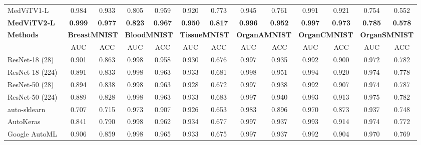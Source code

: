 \documentclass[times,twocolumn,final]{elsarticle}
\begin{document}
\begin{table*}[!htb]
\begin{center}
{\begin{tabular}{l||cc||cc||cc||cc||cc||cc}
            MedViTV1-L~\cite{manzari2023medvit}  & 0.984 & 0.933 &   {0.805} &   {0.959} & {0.920} &  {0.773} &  0.945 & 0.761 &  0.991 &  0.921 &   {0.754} &   {0.552} \\
            \rowcolor{gray!20}
            \textbf{MedViTV2-L} &   \textbf{0.999} &  \textbf{0.977} & \textbf{0.823} & \textbf{0.967} & \textbf{0.950} & \textbf{0.817} &  \textbf{0.996} & \textbf{0.952} & \textbf{0.997} & \textbf{0.973} & \textbf{0.785} & \textbf{0.578}\\
            \midrule \midrule
            \multirow{2.5}{*}{\textbf{Methods}} &
            \multicolumn{2}{c||}{\textbf{BreastMNIST}} &
            \multicolumn{2}{c||}{\textbf{BloodMNIST}} &
            \multicolumn{2}{c||}{\textbf{TissueMNIST}} &
            \multicolumn{2}{c||}{\textbf{OrganAMNIST}} &
            \multicolumn{2}{c||}{\textbf{OrganCMNIST}} &
            \multicolumn{2}{c}{\textbf{OrganSMNIST}} \\ \cline{2-13}
             & AUC & ACC & AUC & ACC & AUC & ACC & AUC & ACC & AUC & ACC & AUC & ACC \\ \midrule
            ResNet-18 (28)~\cite{ResNet}          & 0.901 & 0.863 &  {0.998} & 0.958 & 0.930 & 0.676 & {0.997} & 0.935 & 0.992 & 0.900 & 0.972 & 0.782 \\
            ResNet-18 (224)~\cite{ResNet}         & 0.891 & 0.833 &  {0.998} &  {0.963} & 0.933 & 0.681 & { 0.998} &  { 0.951} &  {0.994} &  { 0.920} & 0.974 & 0.778 \\
            ResNet-50 (28)~\cite{ResNet}          & 0.894 & 0.838 &  {0.998} &  {0.963} & 0.928 & 0.672 & 0.997 & 0.938 & 0.992 & 0.907 & 0.974 & 0.787 \\
            ResNet-50 (224)~\cite{ResNet}         & 0.889 & 0.828 &  {0.998} &  {0.963} & 0.933 & 0.683 & 0.997 & 0.940 & 0.993 & 0.913 & 0.975 & 0.782 \\
            auto-sklearn~\cite{feurer2015efficient}        & 0.707 & 0.715 & 0.973 & 0.907 & 0.926 & 0.653 & 0.983 & 0.896 & 0.970 & 0.873 & 0.937 & 0.748 \\
            AutoKeras~\cite{jin2019auto}           & 0.841 & 0.790 &  {0.998} & 0.962 & 0.934 & 0.677 & 0.997 & 0.937 & 0.993 & 0.914 & 0.974 & 0.772 \\
            Google AutoML~\cite{bisong2019google}  & 0.906 & 0.859 &  {0.998} &  {0.965} & 0.933 & 0.675 & 0.997 & 0.937 & 0.992 & 0.904 & 0.970 & 0.769 \\


\end{tabular}}
\end{center}
\end{table*}
\end{document}
